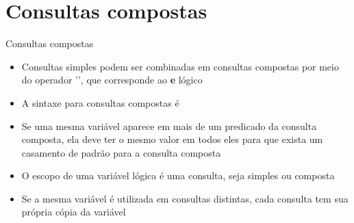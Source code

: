 \section{Consultas compostas}

\begin{frame}[fragile]{Consultas compostas}

    \begin{itemize}
        \item Consultas simples podem ser combinadas em consultas compostas por meio do 
            operador '', que corresponde ao \textbf{e} lógico

        \item A sintaxe para consultas compostas é


        \item Se uma mesma variável aparece em mais de um predicado da consulta composta, ela 
            deve ter o mesmo valor em todos eles para que exista um casamento de padrão para a 
            consulta composta

        \item O escopo de uma variável lógica é uma consulta, seja simples ou composta

        \item Se a mesma variável é utilizada em consultas distintas, cada consulta tem sua 
            própria cópia da variável
    \end{itemize}
\end{frame}

